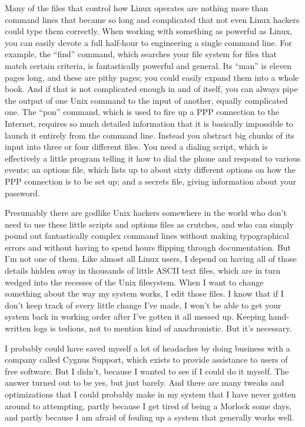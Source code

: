 \documentclass[
  fontsize=11pt,
  paper=landscape,
  twocolumn=true,
  pagesize=pdftex,
  headings=small,
  DIV=15,
  ]{scrartcl}
\begin{document}
Many of the files that control how Linux operates are nothing more than
command lines that became so long and complicated that not even Linux
hackers could type them correctly. When working with something as
powerful as Linux, you can easily devote a full half-hour to engineering
a single command line. For example, the ``find'' command, which searches
your file system for files that match certain criteria, is fantastically
powerful and general. Its ``man'' is eleven pages long, and these are
pithy pages; you could easily expand them into a whole book. And if that
is not complicated enough in and of itself, you can always pipe the
output of one Unix command to the input of another, equally complicated
one. The ``pon'' command, which is used to fire up a PPP connection to
the Internet, requires so much detailed information that it is basically
impossible to launch it entirely from the command line. Instead you
abstract big chunks of its input into three or four different files. You
need a dialing script, which is effectively a little program telling it
how to dial the phone and respond to various events; an options file,
which lists up to about sixty different options on how the PPP
connection is to be set up; and a secrets file, giving information about
your password.

Presumably there are godlike Unix hackers somewhere in the world who
don't need to use these little scripts and options files as crutches,
and who can simply pound out fantastically complex command lines without
making typographical errors and without having to spend hours flipping
through documentation. But I'm not one of them. Like almost all Linux
users, I depend on having all of those details hidden away in thousands
of little ASCII text files, which are in turn wedged into the recesses
of the Unix filesystem. When I want to change something about the way my
system works, I edit those files. I know that if I don't keep track of
every little change I've made, I won't be able to get your system back
in working order after I've gotten it all messed up. Keeping
hand-written logs is tedious, not to mention kind of anachronistic. But
it's necessary.

I probably could have saved myself a lot of headaches by doing business
with a company called Cygnus Support, which exists to provide assistance
to users of free software. But I didn't, because I wanted to see if I
could do it myself. The answer turned out to be yes, but just barely.
And there are many tweaks and optimizations that I could probably make
in my system that I have never gotten around to attempting, partly
because I get tired of being a Morlock some days, and partly because I
am afraid of fouling up a system that generally works well.
\end{document}
